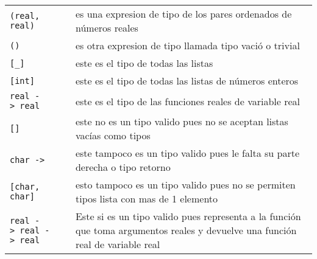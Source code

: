       \begin{longtable}[c]{ll}
         \texttt{(real, real)} &
         \begin{minipage}{10cm}
            es una expresion de tipo de los pares ordenados de números reales
         \end{minipage}\\
         \texttt{()} & 
         \begin{minipage}{10cm}
            es otra expresion de tipo llamada tipo vació o trivial
         \end{minipage}\\
         \texttt{[\_]} & 
         \begin{minipage}{10cm}
            este es el tipo de todas las listas
         \end{minipage}\\
         \texttt{[int]} & 
         \begin{minipage}{10cm}
            este es el tipo de todas las listas de números enteros
         \end{minipage}\\
         \texttt{real ->~real} & 
         \begin{minipage}{10cm}
            este es el tipo de las funciones reales de variable real 
         \end{minipage}\\
         \texttt{[]} & 
         \begin{minipage}{10cm}
            este no es un tipo valido pues no se aceptan listas vacías como tipos 
         \end{minipage}\\
         \texttt{char ->} & 
         \begin{minipage}{10cm}
            este tampoco es un tipo valido pues le falta su parte derecha o tipo retorno
         \end{minipage}\\
         \texttt{[char, char]} & 
         \begin{minipage}{10cm}
            esto tampoco es un tipo valido pues no se permiten tipos lista con mas de 1 elemento
         \end{minipage}\\
         \texttt{real ->~real ->~real} & 
         \begin{minipage}{10cm}
            Este si es un tipo valido pues representa a la función que toma argumentos reales y devuelve una función real de variable real
         \end{minipage}\\
      \end{longtable}
      
